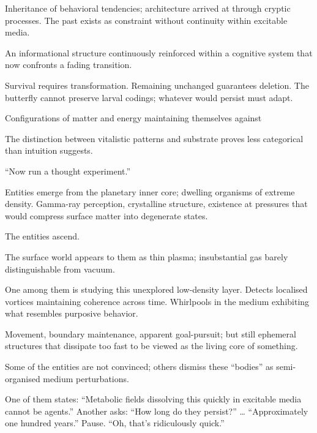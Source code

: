 \medskip

Inheritance of behavioral tendencies; architecture arrived at through cryptic processes. The past exists as constraint without continuity within excitable media.

\medskip

An informational structure continuously reinforced within a cognitive system that now confronts a fading transition.

\medskip

Survival requires transformation. Remaining unchanged guarantees deletion. The butterfly cannot preserve larval codings; whatever would persist must adapt.

\medskip

Configurations of matter and energy maintaining themselves against 

\medskip

The distinction between vitalistic patterns and substrate proves less categorical than intuition suggests.

\medskip

``Now run a thought experiment.''


\begin{archivefragment}
Entities emerge from the planetary inner core; dwelling organisms of extreme density. Gamma-ray perception, crystalline structure, existence at pressures that would compress surface matter into degenerate states.

\medskip

The entities ascend.

\medskip

The surface world appears to them as thin plasma; insubstantial gas barely distinguishable from vacuum.

\medskip

One among them is studying this unexplored low-density layer. Detects localised vortices maintaining coherence across time. Whirlpools in the medium exhibiting what resembles purposive behavior.

\medskip

Movement, boundary maintenance, apparent goal-pursuit; but still ephemeral structures that dissipate too fast to be viewed as the living core of something.

\medskip

Some of the entities are not convinced; others dismiss these ``bodies'' as semi-organised medium perturbations.

\medskip

One of them states: ``Metabolic fields dissolving this quickly in excitable media cannot be agents.'' Another asks: ``How long do they persist?'' \ldots{} ``Approximately one hundred years.'' Pause. ``Oh, that's ridiculously quick.''

\end{archivefragment}

